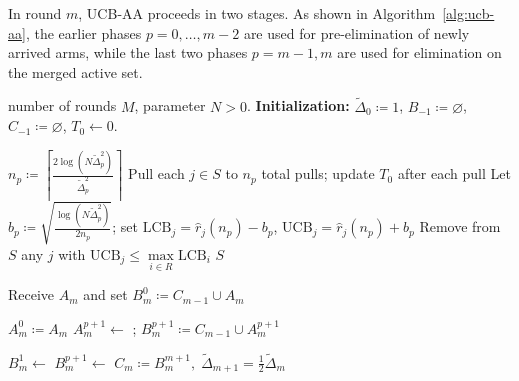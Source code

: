 \documentclass[
  12pt]{article}
\begin{document}
In round $m$, UCB-AA proceeds in two stages. As shown in Algorithm~\ref{alg:ucb-aa}, the earlier phases $p=0,\ldots,m-2$ are used for pre-elimination of newly arrived arms, while the last two phases $p=m-1,m$ are used for elimination on the merged active set. 


\begin{algorithm}[htbp]
\caption{\textbf{UCB for Arriving Arms (UCB-AA)}}
\label{alg:ucb-aa}
\small
\begin{algorithmic}[1]
\Require number of rounds $M$, parameter $N>0$.
\State \textbf{Initialization:} $\tilde{\Delta}_0 \coloneqq 1$, $B_{-1} \coloneqq \varnothing$, $C_{-1} \coloneqq \varnothing$, $T_0 \gets 0$.

    \State $n_p \coloneqq \left\lceil \frac{2\log(N\tilde{\Delta}_p^2)}{\tilde{\Delta}_p^2} \right\rceil$
    \State Pull each $j\in S$ to $n_p$ total pulls; update $T_0$ after each pull
    \State Let $b_p\coloneqq\sqrt{\frac{\log(N\tilde{\Delta}_p^2)}{2n_p}}$; set $\mathrm{LCB}_j=\hat r_j(n_p)-b_p$, $\mathrm{UCB}_j=\hat r_j(n_p)+b_p$
    \State Remove from $S$ any $j$ with $\mathrm{UCB}_j \le \max\limits_{i\in R}\mathrm{LCB}_i$
    \State \Return $S$
\EndProcedure

    \State Receive $A_m$ and set $B_m^0 \coloneqq C_{m-1}\cup A_m$

        \State $A_m^0 \coloneqq A_m$
            \State $A_m^{p+1} \gets$ ; $B_m^{p+1} \coloneqq C_{m-1}\cup A_m^{p+1}$
        \EndFor
    \EndIf

        \State $B_m^{1} \gets$ 
    \Else
            \State $B_m^{p+1} \gets$ 
        \EndFor
    \EndIf
    \State $C_m \coloneqq B_m^{m+1},\; \tilde{\Delta}_{m+1}=\frac{1}{2}\tilde{\Delta}_{m}$
\EndFor
\end{algorithmic}
\end{algorithm}

\end{document}
